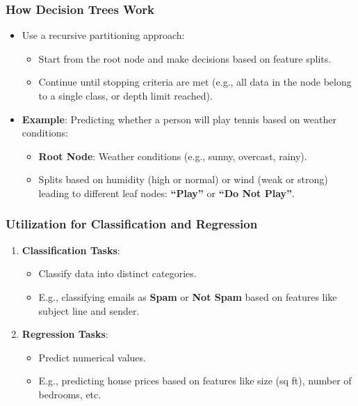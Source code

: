 \documentclass{beamer}
\begin{document}
\begin{frame}[fragile]
    \frametitle{How Decision Trees Work}
    
    \begin{itemize}
        \item Use a recursive partitioning approach:
        \begin{itemize}
            \item Start from the root node and make decisions based on feature splits.
            \item Continue until stopping criteria are met (e.g., all data in the node belong to a single class, or depth limit reached).
        \end{itemize}

        \item \textbf{Example}: Predicting whether a person will play tennis based on weather conditions:
        \begin{itemize}
            \item \textbf{Root Node}: Weather conditions (e.g., sunny, overcast, rainy).
            \item Splits based on humidity (high or normal) or wind (weak or strong) leading to different leaf nodes: \textbf{“Play”} or \textbf{“Do Not Play”}.
        \end{itemize}
    \end{itemize}
\end{frame}

\begin{frame}[fragile]
    \frametitle{Utilization for Classification and Regression}
    
    \begin{enumerate}
        \item \textbf{Classification Tasks}:
        \begin{itemize}
            \item Classify data into distinct categories.
            \item E.g., classifying emails as \textbf{Spam} or \textbf{Not Spam} based on features like subject line and sender.
        \end{itemize}
        
        \item \textbf{Regression Tasks}:
        \begin{itemize}
            \item Predict numerical values.
            \item E.g., predicting house prices based on features like size (sq ft), number of bedrooms, etc.
        \end{itemize}
    \end{enumerate}
\end{frame}
\end{document}
